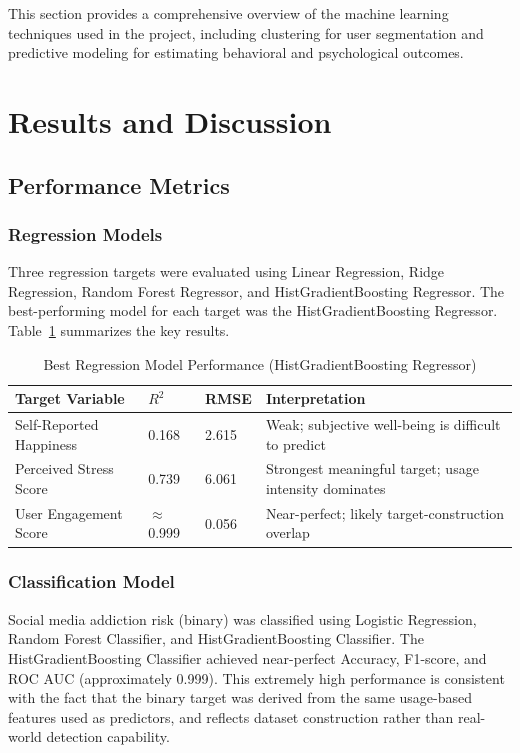 \documentclass[12pt,a4paper]{article}
\begin{document}
This section provides a comprehensive overview of the machine learning techniques used in the project, including clustering for user segmentation and predictive modeling for estimating behavioral and psychological outcomes.
\section{Results and Discussion}
 
\subsection{Performance Metrics}
 
\subsubsection{Regression Models}
 
Three regression targets were evaluated using Linear Regression, Ridge Regression, Random Forest Regressor, and HistGradientBoosting Regressor. The best-performing model for each target was the HistGradientBoosting Regressor. Table~\ref{tab:regression_metrics} summarizes the key results.
 
\begin{table}[H]
\centering
\caption{Best Regression Model Performance (HistGradientBoosting Regressor)}
\label{tab:regression_metrics}
\begin{tabular}{lp{1.7cm}p{1.9cm}p{5.2cm}}
\toprule
\textbf{Target Variable} & \textbf{$R^2$} & \textbf{RMSE} & \textbf{Interpretation} \\
\midrule
Self-Reported Happiness  & 0.168 & 2.615 & Weak; subjective well-being is difficult to predict \\
Perceived Stress Score   & 0.739 & 6.061 & Strongest meaningful target; usage intensity dominates \\
User Engagement Score    & $\approx$0.999 & 0.056 & Near-perfect; likely target-construction overlap \\
\bottomrule
\end{tabular}
\end{table}
 
\subsubsection{Classification Model}
 
Social media addiction risk (binary) was classified using Logistic Regression, Random Forest Classifier, and HistGradientBoosting Classifier. The HistGradientBoosting Classifier achieved near-perfect Accuracy, F1-score, and ROC AUC (approximately 0.999). This extremely high performance is consistent with the fact that the binary target was derived from the same usage-based features used as predictors, and reflects dataset construction rather than real-world detection capability.
 
\end{document}
